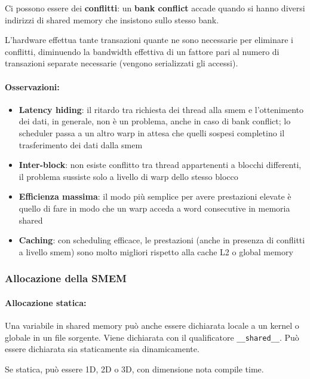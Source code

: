 Ci possono essere dei \textbf{conflitti}: un \textbf{bank conflict} accade quando si hanno diversi indirizzi di shared memory che insistono sullo stesso bank.

L'hardware effettua tante transazioni quante ne sono necessarie per eliminare i conflitti, diminuendo la bandwidth effettiva di un fattore pari al numero di transazioni separate necessarie (vengono serializzati gli accessi).

\paragraph{Osservazioni:}
\begin{itemize}
	\item \textbf{Latency hiding}: il ritardo tra richiesta dei thread alla smem e l'ottenimento dei dati, in generale, non è un problema, anche in caso di bank conflict; lo scheduler passa a un altro warp in attesa che quelli sospesi completino il trasferimento dei dati dalla smem
	
	\item \textbf{Inter-block}: non esiste conflitto tra thread appartenenti a blocchi differenti, il problema sussiste solo a livello di warp dello stesso blocco 
	
	\item \textbf{Efficienza massima}: il modo più semplice per avere prestazioni elevate è quello di fare in modo che un warp acceda a word consecutive in memoria shared
	
	\item \textbf{Caching}: con scheduling efficace, le prestazioni (anche in presenza di conflitti a livello smem) sono molto migliori rispetto alla cache L2 o global memory
\end{itemize}

\subsubsection{Allocazione della SMEM}

\paragraph{Allocazione statica:} Una variabile in shared memory può anche essere dichiarata locale a un kernel o globale in un file sorgente. Viene dichiarata con il qualificatore \texttt{\_\_shared\_\_}. Può essere dichiarata sia staticamente sia dinamicamente. 

Se statica, può essere 1D, 2D o 3D, con dimensione nota compile time.

